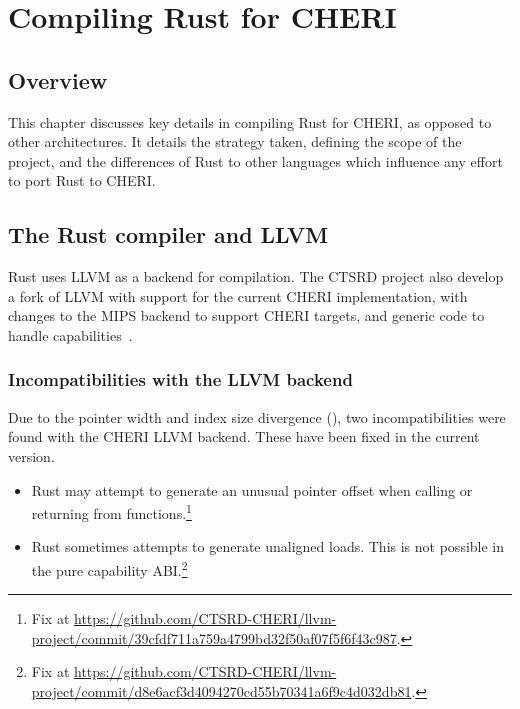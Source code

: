 \documentclass[dissertation.tex]{subfiles}
\begin{document}
\chapter{Compiling Rust for CHERI}
\label{ch:impl}


\section{Overview}

This chapter discusses key details in compiling Rust for CHERI, as
opposed to other architectures.
It details the strategy taken, defining the scope of the project, and
the differences of Rust to other languages which influence any effort to
port Rust to CHERI.


\section{The Rust compiler and LLVM}
\label{sec:impl-rustllvm}

Rust uses LLVM as a backend for compilation.
The CTSRD project also develop a fork of LLVM with support for the
current CHERI implementation, with changes to the MIPS backend to
support CHERI targets, and generic code to handle
capabilities~\cite{cheri-prog-guide}.

\subsection{Incompatibilities with the LLVM backend}
Due to the pointer width and index size divergence
(), two incompatibilities were found with the CHERI
LLVM backend.
These have been fixed in the current version.

\begin{itemize}
    \item Rust may attempt to generate an unusual pointer offset when
    calling or returning from functions.\footnote{Fix at \url{https://github.com/CTSRD-CHERI/llvm-project/commit/39cfdf711a759a4799bd32f50af07f5f6f43c987}.}
    \item Rust sometimes attempts to generate unaligned loads.
    This is not possible in the pure capability ABI.\footnote{Fix at \url{https://github.com/CTSRD-CHERI/llvm-project/commit/d8e6acf3d4094270cd55b70341a6f9c4d032db81}.}
\end{itemize}
\end{document}
